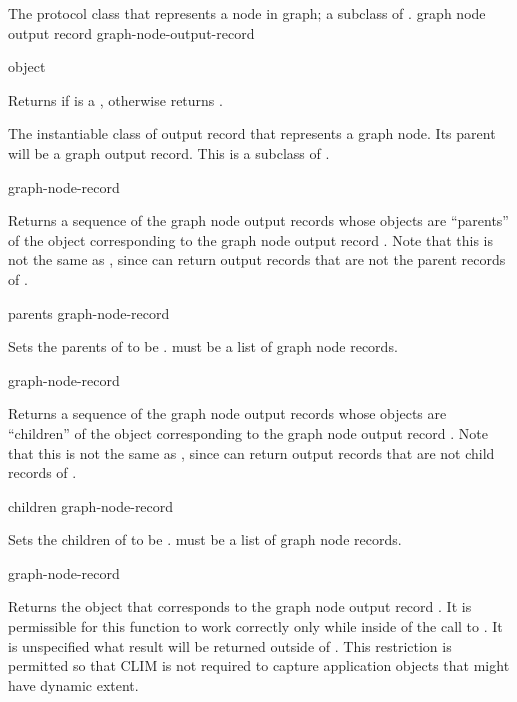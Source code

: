 
The protocol class that represents a node in graph; a subclass of
.
 {graph node output record} {graph-node-output-record}

 {object}

Returns  if  is a ,
otherwise returns .


The instantiable class of output record that represents a graph node.  Its
parent will be a graph output record.  This is a subclass of
.

 {graph-node-record}

Returns a sequence of the graph node output records whose objects are
``parents'' of the object corresponding to the graph node output record
.  Note that this is not the same as
, since  can return output
records that are not the parent records of .

 {parents graph-node-record}

Sets the parents of  to be .  
must be a list of graph node records.

 {graph-node-record}

Returns a sequence of the graph node output records whose objects are
``children'' of the object corresponding to the graph node output record
.  Note that this is not the same as
, since  can return output
records that are not child records of .

 {children graph-node-record}

Sets the children of  to be .
 must be a list of graph node records.

 {graph-node-record}

Returns the object that corresponds to the graph node output record
.  It is permissible for this function to work correctly
only while inside of the call to .  It is unspecified
what result will be returned outside of .  This
restriction is permitted so that CLIM is not required to capture application
objects that might have dynamic extent.
